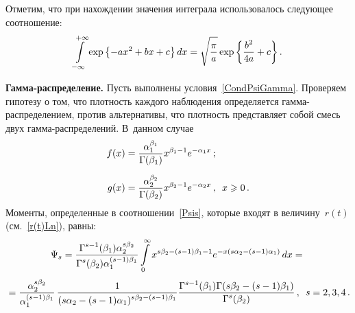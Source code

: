 Отметим, что при нахождении значения интеграла использовалось
следующее соотношение:
$$
\int\limits_{-\infty}^{+\infty}
\exp{\left\{-ax^2+bx+c\right\}}\,dx=\sqrt{\displaystyle\frac{\displaystyle \pi\mathstrut}{\displaystyle a\mathstrut}}\exp{\left\{\displaystyle\frac{\displaystyle b^2\mathstrut}{\displaystyle 4a\mathstrut}+c\right\}}\,.
$$


\textbf{Гамма-распределение.} Пусть выполнены
условия~\eqref{CondPsiGamma}. Проверяем гипотезу о том, что
плот\-ность каждого наблюдения определяется гам\-ма-рас\-пре\-де\-ле\-ни\-ем,
против альтернативы, что плот\-ность представляет собой смесь двух
гамма-распределений. В~данном случае
\begin{align*}
f(x)&=\displaystyle\frac{\displaystyle \alpha_1^{\beta_1}\mathstrut}{\displaystyle \Gamma(\beta_1)\mathstrut}x^{\beta_1-1}e^{-\alpha_1x}\,;\\[6pt]
g(x)&=\displaystyle\frac{\displaystyle \alpha_2^{\beta_2}\mathstrut}{\displaystyle \Gamma(\beta_2)\mathstrut}x^{\beta_2-1}e^{-\alpha_2x}\,,\enskip x\geqslant0\,.
\end{align*}
Моменты, определенные в соотношении~\eqref{Psis}, которые входят в
величину~$r(t)$ (см.~\eqref{r(t)Ln}), равны:
\begin{multline*}
\Psi_s=\displaystyle\frac{\displaystyle \Gamma^{s-1}(\beta_1)\alpha_2^{s\beta_2}\mathstrut}{\displaystyle \Gamma^s(\beta_2)\alpha_1^{(s-1)\beta_1}\mathstrut}
\int\limits_0^\infty x^{s\beta_2-(s-1)\beta_1-1}e^{-x(s\alpha_2-(s-1)\alpha_1)}\,dx={}\\[3pt]
{}=\displaystyle\frac{\displaystyle \alpha_2^{s\beta_2}\mathstrut}{\displaystyle \alpha_1^{(s-1)\beta_1}\mathstrut}\,
\displaystyle\frac{\displaystyle 1\mathstrut}{\displaystyle (s\alpha_2-(s-1)\alpha_1)^{s\beta_2-(s-1)\beta_1}\mathstrut}
\displaystyle\frac{\displaystyle \Gamma^{s-1}(\beta_1)\Gamma(s\beta_2-(s-1)\beta_1)\mathstrut}{\displaystyle \Gamma^s(\beta_2)\mathstrut}\,,\enskip
s=2,3,4\,.
\end{multline*}

\pagebreak



